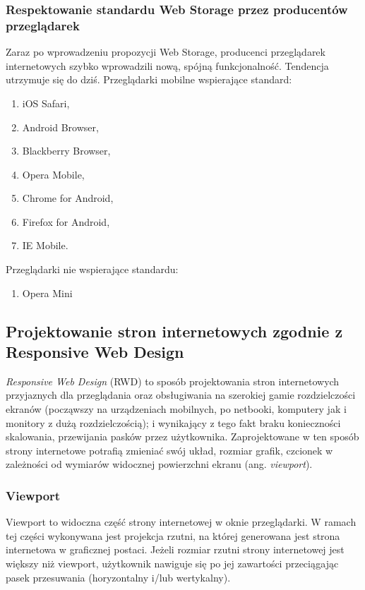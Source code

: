 \subsubsection{Respektowanie standardu Web Storage przez producentów przeglądarek}

Zaraz po wprowadzeniu propozycji Web Storage, producenci przeglądarek internetowych szybko wprowadzili nową, spójną funkcjonalność. Tendencja utrzymuje się do dziś. Przeglądarki mobilne wspierające standard\cite{caniuse-webstorage}:

\begin{enumerate}
  \item iOS Safari,
  \item Android Browser,
  \item Blackberry Browser,
  \item Opera Mobile,
  \item Chrome for Android,
  \item Firefox for Android,
  \item IE Mobile.
\end{enumerate}

Przeglądarki nie wspierające standardu:

\begin{enumerate}
  \item Opera Mini
\end{enumerate}

\subsection{Projektowanie stron internetowych zgodnie z Responsive Web Design}
\label{subsubsec:rwd}

\emph{Responsive Web Design} (RWD) to sposób projektowania stron internetowych przyjaznych dla przeglądania oraz obsługiwania na szerokiej gamie rozdzielczości ekranów (począwszy na urządzeniach mobilnych, po netbooki, komputery jak i monitory z dużą rozdzielczością)\cite{rwd}; i wynikający z tego fakt braku konieczności skalowania, przewijania pasków przez użytkownika. Zaprojektowane w ten sposób strony internetowe potrafią zmieniać swój układ, rozmiar grafik, czcionek w zależności od wymiarów widocznej powierzchni ekranu (ang. \emph{viewport}).

\subsubsection{Viewport}

Viewport to widoczna część strony internetowej w oknie przeglądarki. W ramach tej części wykonywana jest projekcja rzutni, na której generowana jest strona internetowa w graficznej postaci. Jeżeli rozmiar rzutni strony internetowej jest większy niż viewport, użytkownik nawiguje się po jej zawartości przeciągając pasek przesuwania (horyzontalny i/lub wertykalny).

